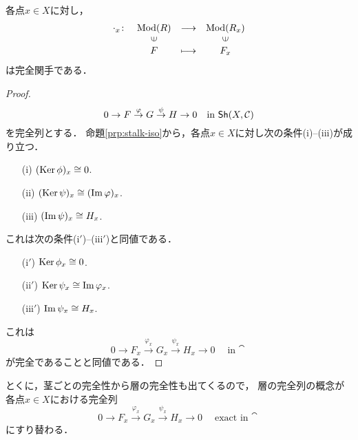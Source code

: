 \begin{PRP}[茎は完全]
    各点$x\in X$に対し，
    \begin{equation*}
        \begin{array}{rccc}
            {\cdot}_x\colon&\Mod(R)&\longrightarrow&\Mod(R_x)\\
            &\rotatebox{90}{$\in$}&&\rotatebox{90}{$\in$}\\
            &F&\longmapsto&F_x        
        \end{array}
    \end{equation*}
    は完全関手である．    
\end{PRP}
\begin{proof}
    \begin{equation*}
        0\to F\overset{\varphi}{\to} 
        G\overset{\psi}{\to}H\to 0
        \quad\text{in $\mathop{\textsf{Sh}}\nolimits(X,\mathcal{C})$}
    \end{equation*}
    を完全列とする．
    命題\ref{prp:stalk-iso}から，各点$x\in X$に対し次の条件(i)--(iii)が成り立つ．
    \begin{enumerate}
        \item [(i)]     $(\mathop{\mathrm{Ker}}\nolimits\phi)_x\cong0$.
        \item [(ii)]    $(\mathop{\mathrm{Ker}}\nolimits\psi)_x\cong(\mathop{\mathrm{Im}}\nolimits\varphi)_x$.
        \item [(iii)]   $(\mathop{\mathrm{Im}}\nolimits\psi)_x\cong H_x$.
    \end{enumerate}
    これは次の条件($\mathrm{i}'$)--($\mathrm{iii}'$)と同値である．
    \begin{enumerate}
        \item [($\mathrm{i}'$)]     $\mathop{\mathrm{Ker}}\nolimits\phi_x\cong0$.
        \item [($\mathrm{ii}'$)]    $\mathop{\mathrm{Ker}}\nolimits\psi_x\cong\mathop{\mathrm{Im}}\nolimits\varphi_x$.
        \item [($\mathrm{iii}'$)]   $\mathop{\mathrm{Im}}\nolimits\psi_x\cong H_x$.
    \end{enumerate}
    これは
    \begin{equation*}
        0\to F_x\overset{\varphi_x}{\longrightarrow} 
        G_x\overset{\psi_x}{\longrightarrow}H_x\to 0
        \quad\text{in $\cat$}
    \end{equation*}
    が完全であることと同値である．    
\end{proof}
とくに，茎ごとの完全性から層の完全性も出てくるので，
層の完全列の概念が各点$x\in X$における完全列
\begin{equation*}
    0\to F_x\overset{\varphi_x}{\longrightarrow} 
    G_x\overset{\psi_x}{\longrightarrow}H_x\to 0
    \quad\text{exact in $\cat$}
\end{equation*}
にすり替わる．

